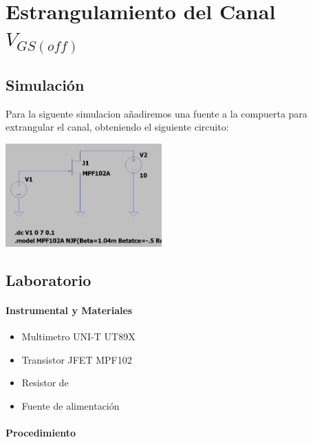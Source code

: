 \newpage

\section{Estrangulamiento del Canal $V_{GS(off)}$}

\subsection{Simulación}

Para la siguente simulacion añadiremos una fuente a la compuerta para extrangular el canal, obteniendo el siguiente circuito:

\includegraphics[width=6cm]{./imagenes/Circ2.png}

\subsection{Laboratorio}

\paragraph{Instrumental y Materiales}
\begin{itemize}
    \item Multimetro UNI-T UT89X
    \item Transistor JFET MPF102
    \item Resistor de
    \item Fuente de alimentación
\end{itemize}

\paragraph{Procedimiento}